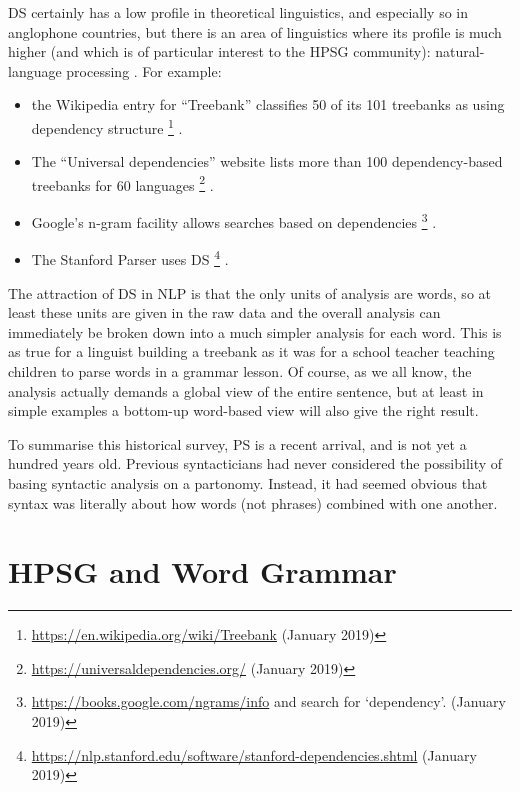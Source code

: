 \documentclass[output=paper]{langscibook}
\begin{document}
DS certainly has a low profile in theoretical linguistics, and especially so in anglophone countries, but there is an area of linguistics where its profile is much higher (and which is of particular interest to the HPSG community): natural-language processing \citep{KMcDN2009a-u}. For example:

\begin{itemize}
	\item the Wikipedia entry for ``Treebank'' classifies 50 of its 101 treebanks as using dependency structure%
	\footnote{\url{https://en.wikipedia.org/wiki/Treebank} (January 2019)}%
	.
	
	\item The ``Universal dependencies'' website lists more than 100 dependency-based treebanks for 60 languages%
	\footnote{\url{https://universaldependencies.org/} (January 2019)}%
	.
	
	\item Google’s n-gram facility allows searches based on dependencies%
	\footnote{\url{https://books.google.com/ngrams/info} and search for ‘dependency’. (January 2019)}%
	.
	
	\item The Stanford Parser \citep{ChenManning2014,deMarneffe&co2014} uses DS%
	\footnote{\url{https://nlp.stanford.edu/software/stanford-dependencies.shtml} (January 2019)}%
	.
\end{itemize}

The attraction of DS in NLP is that the only units of analysis are words, so at least these units are given in the raw data and the overall analysis can immediately be broken down into a much simpler analysis for each word. This is as true for a linguist building a treebank as it was for a school teacher teaching children to parse words in a grammar lesson. Of course, as we all know, the analysis actually demands a global view of the entire sentence, but at least in simple examples a bottom-up word-based view will also give the right result.

To summarise this historical survey, PS is a recent arrival, and is not yet a hundred years old. Previous syntacticians had never considered the possibility of basing syntactic analysis on a partonomy. Instead, it had seemed obvious that syntax was literally about how words (not phrases) combined with one another.


\section{HPSG and Word Grammar}
\label{sec:3}
\end{document}
